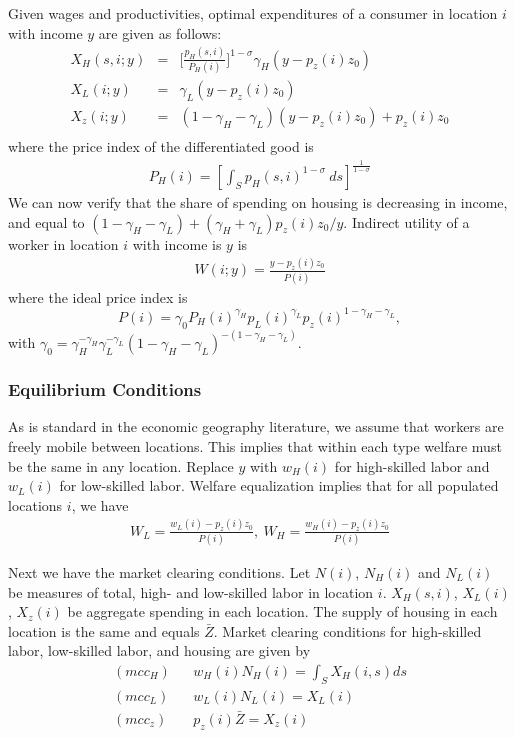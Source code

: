 \documentclass{article}
\begin{document}
Given wages and productivities, optimal expenditures of a consumer in location $i$ with income $y$ are given as follows:
\begin{eqnarray}
	X_H(s,i;y) & = & \Big[ \frac{p_H(s,i)}{P_H(i)} \Big]^{1-\sigma} \gamma_H (y-p_z(i)z_0) \nonumber \\
	X_L(i;y)   & = & \gamma_L (y-p_z(i)z_0) \nonumber \\
	X_z(i;y)   & = & (1-\gamma_H-\gamma_L)(y-p_z(i) z_0)+p_z(i)z_0 \\
    \label{eq:house_demand}
\end{eqnarray}
where the price index of the differentiated good is
\begin{eqnarray}
    \label{eq:nonhomo_price_index}
	P_H(i) = \left[\int_S p_H(s,i)^{1-\sigma}~ ds\right]^{\frac{1}{1-\sigma}}
\end{eqnarray} 
We can now verify that the share of spending on housing is decreasing in income, and equal to $(1-\gamma_H-\gamma_L)+(\gamma_H+\gamma_L){p_z(i)z_0}/{y}$. 
Indirect utility of a worker in location $i$ with income is $y$ is
\begin{eqnarray}
	W(i;y)  =  \frac{y-p_z(i)z_0}{P(i)} \nonumber
\end{eqnarray}
where the ideal price index is
\[
	P(i)  = \gamma_{0}
	P_H(i)^{\gamma_H}p_L(i)^{\gamma_L}p_z(i)^{1-\gamma_H-\gamma_L},
\]
with $\gamma_{0}=\gamma_H^{-\gamma_H} \gamma_L^{-\gamma_L}(1-\gamma_H-\gamma_L)^{-(1-\gamma_H-\gamma_L)}$.

\subsubsection{Equilibrium Conditions}

As is standard in the economic geography literature, we assume that workers are freely mobile between locations.  This implies that within each type welfare must be the same in any location.  Replace $y$ with $w_H(i)$ for high-skilled labor and $w_L(i)$ for low-skilled labor.  Welfare equalization implies that for all populated locations $i$, we have
\begin{eqnarray}
	W_L = \frac{w_L(i)-p_z(i)z_0}{P(i)} , ~ 	
	W_H = \frac{w_H(i)-p_z(i)z_0}{P(i)}
    \label{eq:weleq}
\end{eqnarray}

Next we have the market clearing conditions.  Let $N(i)$, $N_H(i)$ and $N_L(i)$ be measures of total, high- and low-skilled labor in location $i$.  $X_H(s,i)$, $X_L(i)$, $X_z(i)$ be aggregate spending in each location.  The supply of housing in each location is the same and equals $\bar{Z}$. Market clearing conditions for high-skilled labor, low-skilled labor, and housing are given by
\begin{eqnarray}
	(mcc_H) & & w_H(i) N_H(i) = \int_S X_H(i,s) ds  \nonumber \\
	(mcc_L) & & w_L(i) N_L(i) = X_L(i) \nonumber \\
	(mcc_z) & & p_z(i) \bar{Z} = X_z(i)  \nonumber
\end{eqnarray}
\end{document}
